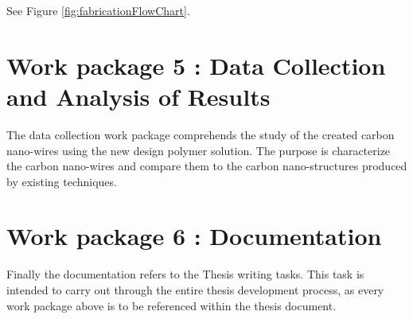 See Figure \ref{fig:fabricationFlowChart}.
	
\section{Work package 5 : Data Collection and Analysis of Results}
The data collection work package comprehends the study of the created carbon nano-wires using the new design polymer solution. The purpose is characterize the carbon nano-wires and compare them to the carbon nano-structures produced by existing techniques.

\section{Work package 6 : Documentation}
Finally the documentation refers to the Thesis writing tasks. This task is intended to carry out through the entire thesis development process, as every work package above is to be referenced within the thesis document.



